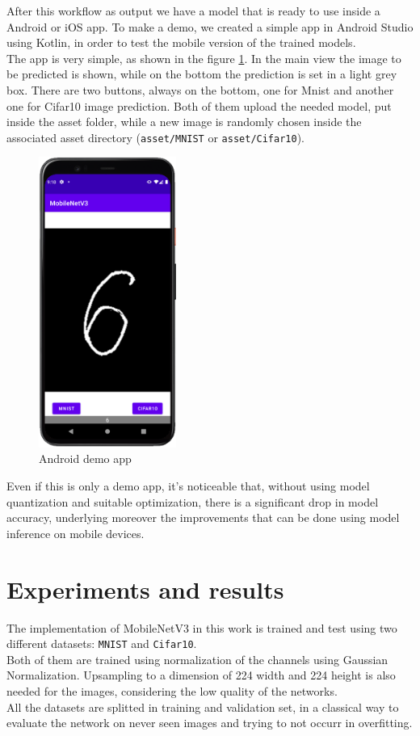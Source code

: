 \documentclass[12pt, letterpaper, twoside]{article}
\begin{document}
After this workflow as output we have a model that is ready to use inside a Android or iOS app. To make a demo, we created a simple app in Android Studio using Kotlin, in order to test the mobile version of the trained models.\\
The app is very simple, as shown in the figure \ref{fig:demo_app}. In the main view the image to be predicted is shown, while on the bottom the prediction is set in a light grey box. There are two buttons, always on the bottom, one for Mnist and another one for Cifar10 image prediction. Both of them upload the needed model, put inside the asset folder, while a new image is randomly chosen inside the associated asset directory (\verb|asset/MNIST| or \verb|asset/Cifar10|).

\begin{figure}[H]
	\centering
	\includegraphics[width=0.4\textwidth]{demo_app.png}
	\caption{Android demo app}
	\label{fig:demo_app}
\end{figure}

Even if this is only a demo app, it's noticeable that, without using model quantization and suitable optimization, there is a significant drop in model accuracy, underlying moreover the improvements that can be done using model inference on mobile devices.

\clearpage
\section{Experiments and results}
The implementation of MobileNetV3 in this work is trained and test using two different datasets: \verb|MNIST| and \verb|Cifar10|. \\
Both of them are trained using normalization of the channels using Gaussian Normalization. Upsampling to a dimension of 224 width and 224 height is also needed for the images, considering the low quality of the networks.\\
All the datasets are splitted in training and validation set, in a classical way to evaluate the network on never seen images and trying to not occurr in overfitting.
\end{document}
